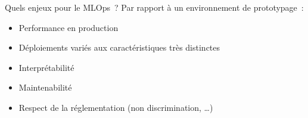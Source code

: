 \begin{frame}{Quels enjeux pour le MLOps~?}
  Par rapport à un environnement de prototypage~:

  \begin{itemize}
    \item Performance en production
    \item Déploiements variés aux caractéristiques très distinctes
    \item Interprétabilité
    \item Maintenabilité
    \item Respect de la réglementation (non discrimination, …)
  \end{itemize}
\end{frame}

\begin{frame}{}
  
\end{frame}